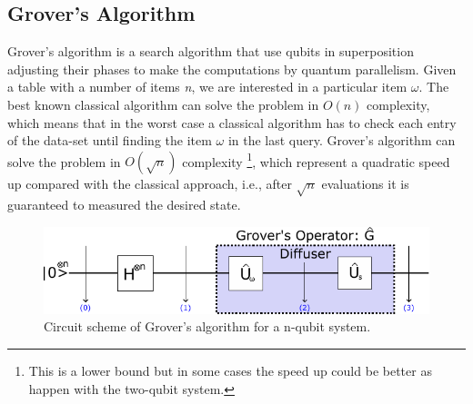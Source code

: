 \subsection{Grover's Algorithm}
Grover's algorithm is a search algorithm that use qubits in superposition adjusting their phases to make the computations by quantum parallelism. Given a table with a number of items \textit{n}, we are interested in a particular item $\omega$. The best known classical algorithm can solve the problem in $O(n)$ complexity, which means that in the worst case a classical algorithm has to check each entry of the data-set until finding the item $\omega$ in the last query. Grover's algorithm can solve the problem in $O(\sqrt{n})$ complexity \footnote{This is a lower bound but in some cases the speed up could be better as happen with the two-qubit system.}, which represent a quadratic speed up compared with the classical approach, i.e., after $\sqrt{n}$ evaluations it is guaranteed to measured the desired state.
\begin{figure}[h]
    \centering
    \includegraphics[scale=0.8]{Figures/Grover_Circuit.pdf}
    \caption{Circuit scheme of Grover's algorithm for a n-qubit system.}
    \label{fig:Grover_circuit}
\end{figure}
